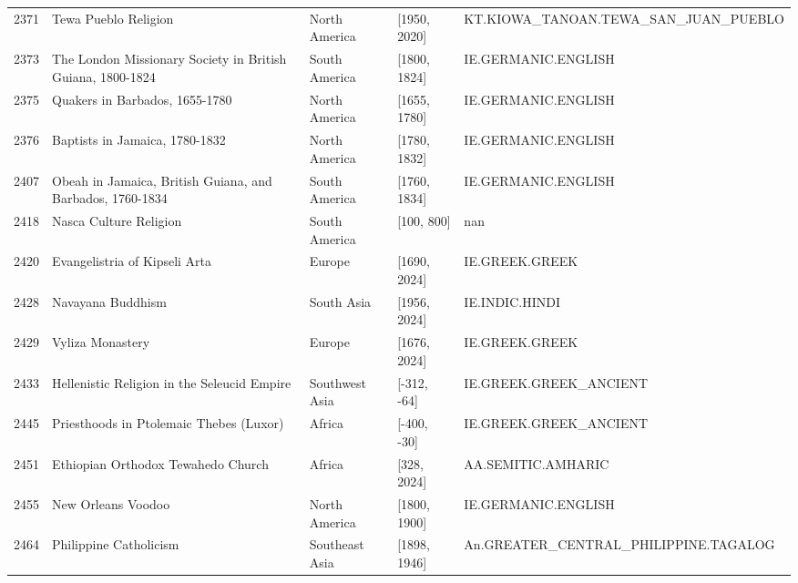 {\begin{longtable}{rp{3.5cm}llp{3.5cm}}
2371 & {\raggedright Tewa Pueblo Religion} & North America & [1950, 2020] & {\raggedright KT.\allowbreak{}KIOWA\_\allowbreak{}TANOAN.\allowbreak{}TEWA\_\allowbreak{}SAN\_\allowbreak{}JUAN\_\allowbreak{}PUEBLO} \\
2373 & {\raggedright The London Missionary Society in British Guiana, 1800-1824} & South America & [1800, 1824] & {\raggedright IE.\allowbreak{}GERMANIC.\allowbreak{}ENGLISH} \\
2375 & {\raggedright Quakers in Barbados, 1655-1780} & North America & [1655, 1780] & {\raggedright IE.\allowbreak{}GERMANIC.\allowbreak{}ENGLISH} \\
2376 & {\raggedright Baptists in Jamaica, 1780-1832} & North America & [1780, 1832] & {\raggedright IE.\allowbreak{}GERMANIC.\allowbreak{}ENGLISH} \\
2407 & {\raggedright Obeah in Jamaica, British Guiana, and Barbados, 1760-1834} & South America & [1760, 1834] & {\raggedright IE.\allowbreak{}GERMANIC.\allowbreak{}ENGLISH} \\
2418 & {\raggedright Nasca Culture Religion} & South America & [100, 800] & {\raggedright nan} \\
2420 & {\raggedright Evangelistria of Kipseli Arta} & Europe & [1690, 2024] & {\raggedright IE.\allowbreak{}GREEK.\allowbreak{}GREEK} \\
2428 & {\raggedright Navayana Buddhism} & South Asia & [1956, 2024] & {\raggedright IE.\allowbreak{}INDIC.\allowbreak{}HINDI} \\
2429 & {\raggedright Vyliza Monastery} & Europe & [1676, 2024] & {\raggedright IE.\allowbreak{}GREEK.\allowbreak{}GREEK} \\
2433 & {\raggedright Hellenistic Religion in the Seleucid Empire} & Southwest Asia & [-312, -64] & {\raggedright IE.\allowbreak{}GREEK.\allowbreak{}GREEK\_\allowbreak{}ANCIENT} \\
2445 & {\raggedright Priesthoods in Ptolemaic Thebes (Luxor)} & Africa & [-400, -30] & {\raggedright IE.\allowbreak{}GREEK.\allowbreak{}GREEK\_\allowbreak{}ANCIENT} \\
2451 & {\raggedright Ethiopian Orthodox Tewahedo Church} & Africa & [328, 2024] & {\raggedright AA.\allowbreak{}SEMITIC.\allowbreak{}AMHARIC} \\
2455 & {\raggedright New Orleans Voodoo} & North America & [1800, 1900] & {\raggedright IE.\allowbreak{}GERMANIC.\allowbreak{}ENGLISH} \\
2464 & {\raggedright Philippine Catholicism} & Southeast Asia & [1898, 1946] & {\raggedright An.\allowbreak{}GREATER\_\allowbreak{}CENTRAL\_\allowbreak{}PHILIPPINE.\allowbreak{}TAGALOG} \\

\end{longtable}}
